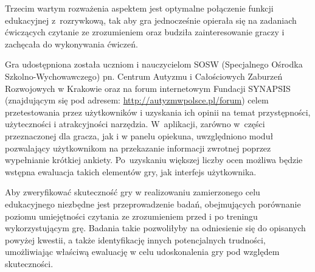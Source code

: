 Trzecim wartym rozważenia aspektem jest optymalne połączenie funkcji edukacyjnej z~rozrywkową, tak aby gra jednocześnie opierała się na zadaniach ćwiczących czytanie ze zrozumieniem oraz budziła zainteresowanie graczy i zachęcała do wykonywania ćwiczeń.

Gra udostępniona została uczniom i nauczycielom SOSW (Specjalnego Ośrodka Szkolno-Wychowawczego) pn. Centrum Autyzmu i Całościowych Zaburzeń Rozwojowych w Krakowie oraz na forum internetowym Fundacji SYNAPSIS (znajdującym się pod adresem: \url{http://autyzmwpolsce.pl/forum}) celem przetestowania przez użytkowników i uzyskania ich opinii na temat przystępności, użyteczności i atrakcyjności narzędzia.
W~aplikacji, zarówno w~części przeznaczonej dla gracza, jak i w panelu opiekuna, uwzględniono moduł pozwalający użytkownikom na przekazanie informacji zwrotnej poprzez wypełnianie krótkiej ankiety.
Po~uzyskaniu większej liczby ocen możliwa będzie wstępna ewaluacja takich elementów gry, jak interfejs użytkownika.

Aby zweryfikować skuteczność gry w realizowaniu zamierzonego celu edukacyjnego niezbędne jest przeprowadzenie badań, obejmujących porównanie poziomu umiejętności czytania ze zrozumieniem przed i po treningu wykorzystującym grę.
Badania takie pozwoliłyby na odniesienie się do opisanych powyżej kwestii, a także identyfikację innych potencjalnych trudności, umożliwiając właściwą ewaluację w celu udoskonalenia gry pod względem skuteczności.